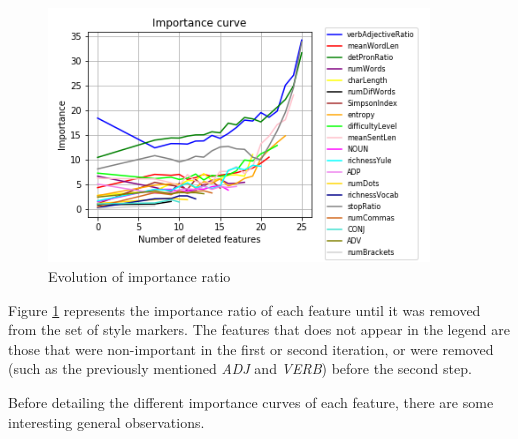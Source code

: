 \begin{figure}
	\centering%
	\centerline{\includegraphics[width=0.9\textwidth]{Imagenes/Bitmap/DecisionTrees/limportancecurve.png}}%
	\caption{Evolution of importance ratio}%
	\label{fig:impcurv}
\end{figure}

Figure \ref{fig:impcurv} represents the importance ratio of each feature until it was removed from the set of style markers. The features that does not appear in the legend are those that were non-important in the first or second iteration, or were removed (such as the previously mentioned \textit{ADJ} and \textit{VERB}) before the second step.

Before detailing the different importance curves of each feature, there are some interesting general observations.
